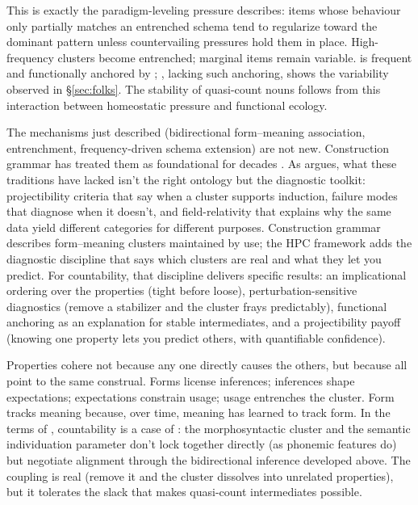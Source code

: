 \documentclass[12pt,a4paper]{article}
\begin{document}
This is exactly the paradigm-leveling pressure \textcite{bybee2010} describes: items whose behaviour only partially matches an entrenched schema tend to regularize toward the dominant pattern unless countervailing pressures hold them in place. High-frequency clusters become entrenched; marginal items remain variable.  is frequent and functionally anchored by ; , lacking such anchoring, shows the variability observed in \S\ref{sec:folks}. The stability of quasi-count nouns follows from this interaction between homeostatic pressure and functional ecology.

The mechanisms just described (bidirectional form--meaning association, entrenchment, frequency-driven schema extension) are not new. Construction grammar has treated them as foundational for decades \citep{goldberg1995constructions,langacker1987foundations,bybee2010}. As \textcite{reynolds2025stack} argues, what these traditions have lacked isn't the right ontology but the diagnostic toolkit: projectibility criteria that say when a cluster supports induction, failure modes that diagnose when it doesn't, and field-relativity that explains why the same data yield different categories for different purposes. Construction grammar describes form--meaning clusters maintained by use; the HPC framework adds the diagnostic discipline that says which clusters are real and what they let you predict. For countability, that discipline delivers specific results: an implicational ordering over the properties (tight before loose), perturbation-sensitive diagnostics (remove a stabilizer and the cluster frays predictably), functional anchoring as an explanation for stable intermediates, and a projectibility payoff (knowing one property lets you predict others, with quantifiable confidence).

Properties cohere not because any one directly causes the others, but because all point to the same construal. Forms license inferences; inferences shape expectations; expectations constrain usage; usage entrenches the cluster. Form tracks meaning because, over time, meaning has learned to track form. In the terms of \textcite{reynolds2025stack}, countability is a case of : the morphosyntactic cluster and the semantic individuation parameter don't lock together directly (as phonemic features do) but negotiate alignment through the bidirectional inference developed above. The coupling is real (remove it and the cluster dissolves into unrelated properties), but it tolerates the slack that makes quasi-count intermediates possible.
\end{document}
